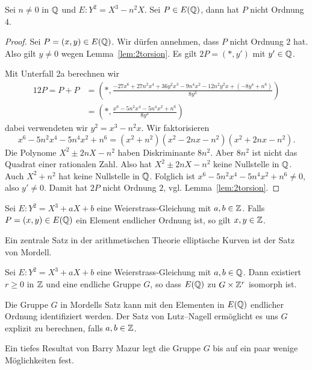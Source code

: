 \begin{lemma}
  \label{len:noorder4}
  Sei $n\not=0$ in ${\mathbb{Q}}$ und $E:Y^2 = X^3-n^2X$. Sei $P\in E({\mathbb{Q}})$,
  dann hat $P$ nicht Ordnung $4$. 
\end{lemma}
\begin{proof}
  Sei  $P =(x,y)\in E({\mathbb{Q}})$. Wir dürfen annehmen, dass $P$ nicht
  Ordnung $2$ hat. Also gilt $y\not=0$ wegen Lemma~\ref{lem:2torsion}.
  Es gilt  
  $2P=(*,y')$ mit $y'\in {\mathbb{Q}}$.

  Mit Unterfall 2a berechnen wir
  \begin{alignat*}1
    2P= P+P &=\left(*, \frac{-27x^6 + 27n^2x^4 + 36y^2x^3 -
        9n^4x^2 - 12n^2y^2x + (-8y^4 + n^6)}{8y^3}\right)\\
    &= \left(*, \frac{x^6 - 5n^2x^4 - 5n^4x^2 + n^6}{8y^3}\right)
  \end{alignat*}
  dabei verwendeten wir $y^2 = x^3-n^2x$.
  Wir faktorisieren
  $$
  x^6 - 5n^2x^4 - 5n^4x^2 + n^6 = (x^2+n^2)(x^2-2nx-n^2)(x^2+2nx-n^2). 
  $$
  Die Polynome $X^2\pm 2nX-n^2$ haben Diskriminante $8n^2$. Aber
  $8n^2$ ist nicht das Quadrat einer rationalen Zahl. Also hat $X^2\pm
  2nX-n^2$ keine Nullstelle in ${\mathbb{Q}}$. Auch $X^2+n^2$ hat keine
  Nullstelle in ${\mathbb{Q}}$. Folglich ist
  $x^6 - 5n^2x^4 - 5n^4x^2 + n^6\not=0$, also $y'\not=0$. Damit hat $2P$ nicht
  Ordnung $2$, vgl. Lemma~\ref{lem:2torsion}. 
\end{proof}

\begin{satz}
  Sei $E:Y^2=X^3+aX+b$ eine Weierstrass-Gleichung mit $a,b\in{\mathbb{Z}}$.
  Falls $ P =(x,y)\in E({\mathbb{Q}})$ ein Element endlicher Ordnung ist, so
  gilt $x,y\in{\mathbb{Z}}$. 
\end{satz}

Ein zentrale Satz in der arithmetischen Theorie elliptische Kurven ist
der Satz von Mordell.

\begin{satz}[Mordell (1922)]\label{satz:mordell}
  Sei $E:Y^2 = X^3+aX+b$ eine
  Weierstrass-Gleichung mit $a,b\in{\mathbb{Q}}$. Dann existiert $r\ge 0$ in
  ${\mathbb{Z}}$ und eine endliche Gruppe $G$, so dass
  $E({\mathbb{Q}})$ zu $G\times {\mathbb{Z}}^r$ isomorph ist.
\end{satz}

Die Gruppe $G$ in Mordells Satz kann mit den Elementen in $E({\mathbb{Q}})$
endlicher Ordnung identifiziert werden. Der Satz von Lutz--Nagell
ermöglicht es uns $G$ explizit zu berechnen, falls $a,b\in{\mathbb{Z}}$.

Ein tiefes Resultat von Barry Mazur legt die Gruppe $G$ bis auf ein
paar wenige Möglichkeiten fest.

